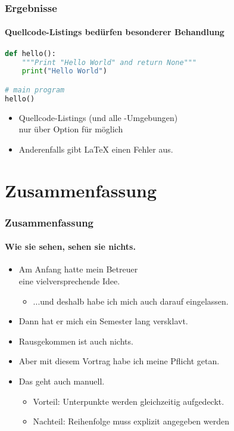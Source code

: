 \documentclass[utf8]{beamer}
\begin{document}
\begin{frame}[fragile]
\frametitle{Ergebnisse}
\framesubtitle{Quellcode-Listings bedürfen besonderer Behandlung}

\begin{lstlisting}[language=Python]
def hello():
    """Print "Hello World" and return None"""
    print("Hello World")

# main program
hello()
\end{lstlisting}

\begin{itemize}
\item Quellcode-Listings (und alle -Umgebungen)\\ nur über Option  für  möglich
\item Anderenfalls gibt \LaTeX{} einen Fehler aus.
\end{itemize}

\end{frame}


\section{Zusammenfassung}


\begin{frame}
\frametitle{Zusammenfassung}
\framesubtitle{Wie sie sehen, sehen sie nichts.}


\begin{itemize}[<+->]
\item Am Anfang hatte mein Betreuer\\ eine vielversprechende Idee.
\begin{itemize}
\item ...und deshalb habe ich mich auch darauf eingelassen.
\end{itemize}

\item Dann hat er mich ein Semester lang versklavt.

\item Rausgekommen ist auch nichts.

\item Aber mit diesem Vortrag habe ich meine Pflicht getan.
\end{itemize}

\begin{itemize}
\item<6-> Das geht auch manuell.
\begin{itemize}
\item Vorteil: Unterpunkte werden gleichzeitig aufgedeckt.
\item Nachteil: Reihenfolge muss \alert<7->{explizit angegeben} werden
\end{itemize}
\end{itemize}

\end{frame}
\end{document}
